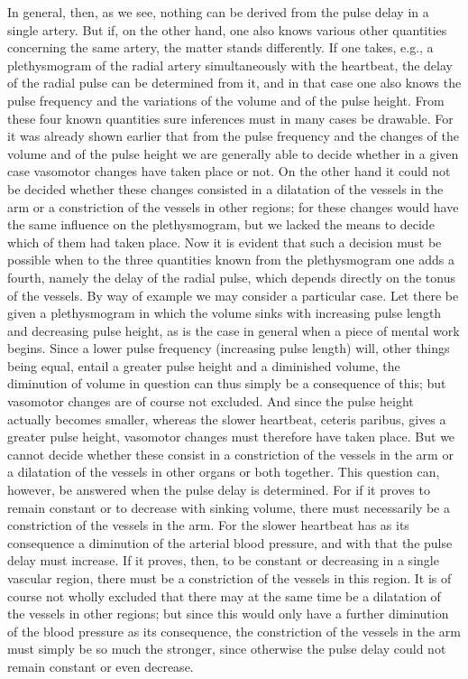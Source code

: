 \documentclass[12pt,a4paper,openany]{book}
\newcommand{\opage}[1]{\marginnote{\footnotesize\textit{[#1]}}}
\begin{document}
In general, then, as we see, nothing can be derived
from the pulse delay in a single artery. But if, on the other hand,
one also knows various other quantities concerning
the same artery, the matter stands differently. If one takes,
e.g., a plethysmogram of the radial artery simultaneously with
the heartbeat, the delay of the radial pulse can be determined from it,
and in that case one also knows the pulse frequency
and the variations of the volume and of the pulse height. From these four known
quantities sure inferences must in many cases be
drawable. For it was already shown earlier
that from the pulse frequency and the changes of the volume and of the pulse height we
are generally able to decide whether in
\setcounter{footnote}{0}%
\opage{278}a given case vasomotor changes have taken place
or not. On the other hand it could not be decided whether these
changes consisted in a dilatation of the vessels in the arm or a constriction of the vessels
in other regions; for these changes would
have the same influence on the plethysmogram, but
we lacked the means to decide which of them had taken
place. Now it is evident that such a decision must
be possible when to the three quantities known from the plethysmogram
one adds a fourth, namely the delay of the radial pulse,
which depends directly on the tonus of the vessels. By way of example
we may consider a particular case. Let there be given
a plethysmogram in which the volume sinks with increasing
pulse length and decreasing pulse height, as is the case in
general when a piece of mental work begins. Since a lower
pulse frequency (increasing pulse length) will, other things being equal,
entail a greater pulse height and a diminished volume,
the diminution of volume in question can thus simply
be a consequence of this; but vasomotor changes are
of course not excluded. And since the pulse height actually becomes
smaller, whereas the slower heartbeat, ceteris paribus,
gives a greater pulse height, vasomotor changes must
therefore have taken place. But we cannot decide whether
these consist in a constriction of the vessels in the arm or a dilatation of the vessels
in other organs or both together. This
question can, however, be answered when the pulse delay is determined.
For if it proves to remain constant or to
decrease with sinking volume, there must necessarily
be a constriction of the vessels in the arm. For the slower
heartbeat has as its consequence a diminution of the arterial blood pressure,
and with that the pulse delay must increase. If it proves,
then, to be constant or decreasing in a single vascular region,
there must be a constriction of the vessels in this region.
It is of course not wholly excluded that there may at the same time
be a dilatation of the vessels in other regions; but since this
would only have a further diminution of the blood pressure as its
\setcounter{footnote}{0}%
\opage{279}consequence, the constriction of the vessels in the arm must simply be so much the
stronger, since otherwise the pulse delay could not remain
constant or even decrease.
\end{document}
